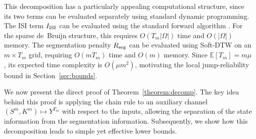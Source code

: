 \documentclass[onecolumn]{IEEEtran}
\theoremstyle{definition}
\begin{document}
This decomposition has a particularly appealing computational structure,
since its two terms can be evaluated separately using standard dynamic
programming. The ISI term \(I_{\rm ISI}\) can be evaluated using the
standard forward algorithm \cite{Pfister2001,Arnold2001}.
{For the sparse de~Bruijn structure, this requires
\(O(T_m|\Omega|)\) time and \(O(|\Omega|)\) memory.}
The segmentation penalty \(R_{\rm seg}\) can be evaluated using Soft-DTW on
an \(m\times T_m\) grid, requiring
{\(O(mT_m)\) time and \(O(m)\) memory}.
Since \(\mathbb{E}[T_m]=m\mu\), its expected time complexity is
{\(O(\mu m^2)\)}, motivating the local jump-reliability bound
in Section~\ref{sec:bounds}.

We now present the direct proof of Theorem~\ref{theorem:decomp}. The key idea behind this proof is applying the chain rule to an auxiliary channel $(S^m,K^m)\mapsto Y^{T_m}$ with respect to the inputs, allowing the separation of the state information from the segmentation information. Subsequently, we show how this decomposition leads to simple yet effective lower bounds. 
\end{document}
